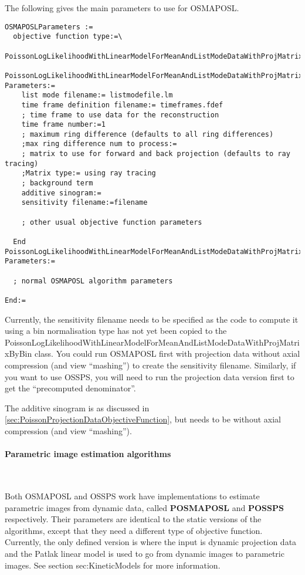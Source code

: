\documentclass{article}
\newcommand{\subsubsubsection}[1]{\paragraph{#1}\mbox{} \\}
\begin{document}
{The following gives the main parameters to use for OSMAPOSL.
{ \small
\begin{verbatim}
OSMAPOSLParameters :=
  objective function type:=\
     PoissonLogLikelihoodWithLinearModelForMeanAndListModeDataWithProjMatrixByBin
  PoissonLogLikelihoodWithLinearModelForMeanAndListModeDataWithProjMatrixByBin Parameters:=
    list mode filename:= listmodefile.lm
    time frame definition filename:= timeframes.fdef
    ; time frame to use data for the reconstruction
    time frame number:=1
    ; maximum ring difference (defaults to all ring differences)
    ;max ring difference num to process:=
    ; matrix to use for forward and back projection (defaults to ray tracing)
    ;Matrix type:= using ray tracing
    ; background term
    additive sinogram:=
    sensitivity filename:=filename

    ; other usual objective function parameters 

  End PoissonLogLikelihoodWithLinearModelForMeanAndListModeDataWithProjMatrixByBin Parameters:=

  ; normal OSMAPOSL algorithm parameters 

End:=
\end{verbatim}
}

Currently, the sensitivity filename needs to be specified as the code to compute it using
a bin normalisation type has not yet been copied to the 
PoissonLogLikelihoodWithLinearModelForMeanAndListModeDataWithProjMatrixByBin
class. You could run OSMAPOSL first with projection data without axial compression (and view
``mashing'') to create the sensitivity filename. Similarly, if you want to use OSSPS,
you will need to run the projection data version first to get the ``precomputed denominator''.

The additive sinogram is as discussed in \ref{sec:PoissonProjectionDataObjectiveFunction}, 
but needs to be without axial compression (and view ``mashing'').

{ \subsubsubsection{Parametric image estimation algorithms}
}
\label{sec:ParametricImageIterativeAlgorithms}
Both OSMAPOSL and OSSPS work have implementations to estimate parametric images from
dynamic data, called \textbf{POSMAPOSL} and \textbf{POSSPS} respectively. 
Their parameters are identical to the static versions of the algorithms, except that
they need a different type of objective function. Currently, the only defined version is
where the input is dynamic projection data and the Patlak linear model is used to go from
dynamic images to parametric images. See section {sec:KineticModels} for more information.

}
\end{document}
